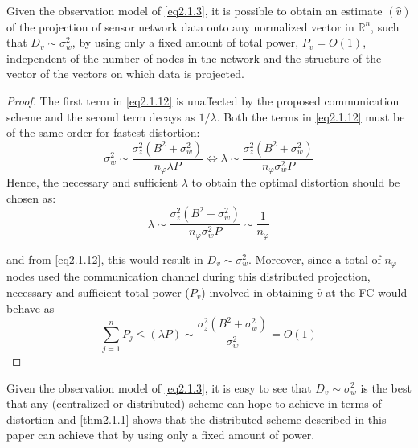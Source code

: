 \begin{theorem}
    \label{thm2.1.1}
    Given the observation model of \cref{eq2.1.3}, it is possible to obtain an estimate $(\hat{v})$ of the projection of sensor network data onto any normalized vector in $\mathbb{R}^n$, such that $D_v \sim \sigma_w^2$, by using only a fixed amount of total power, $P_v = O(1)$, independent of the number of nodes in the network and the structure of the vector of the vectors on which data is projected.
\end{theorem}

\begin{proof}
    The first term in \cref{eq2.1.12} is unaffected by the proposed communication scheme and the second term decays as $1/\lambda$. Both the terms in \cref{eq2.1.12} must be of the same order for fastest distortion:
    \begin{equation}
        \sigma_w^2 \sim \dfrac{\sigma_z^2(B^2+\sigma_w^2)}{n_{\varphi}\lambda P} \Longleftrightarrow \lambda \sim \dfrac{\sigma_z^2(B^2+\sigma_w^2)}{n_{\varphi} \sigma_w^2 P}
        \label{eq2.1.13}
    \end{equation}
    Hence, the necessary and sufficient $\lambda$ to obtain the optimal distortion should be chosen as:
    \begin{equation}
        \lambda \sim \dfrac{\sigma_z^2(B^2+\sigma_w^2)}{n_{\varphi}\sigma_w^2 P} \sim \dfrac{1}{n_{\varphi}}
        \label{eq2.1.14}
    \end{equation}

    and from \cref{eq2.1.12}, this would result in $D_v \sim \sigma_w^2$. Moreover, since a total of $n_{\varphi}$ nodes used the communication channel during this distributed projection, necessary and sufficient total power ($P_v$) involved in obtaining $\hat{v}$ at the FC would behave as 
    \begin{equation}
        \sum_{j=1}^{n}P_j \leq (\lambda P) \sim \dfrac{\sigma_z^2(B^2+\sigma_w^2)}{\sigma_w^2} = O(1)
        \label{eq2.1.15}
    \end{equation}
\end{proof}


\begin{remark}
    \label{rmk2.1.1}
    Given the observation model of \cref{eq2.1.3}, it is easy to see that $D_v \sim \sigma_w^2$ is the best that any (centralized or distributed) scheme can hope to achieve in terms of distortion and \cref{thm2.1.1} shows that the distributed scheme described in this paper can achieve that by using \textcolor[rgb]{1,0,0}{only a fixed amount of power}.
\end{remark}

